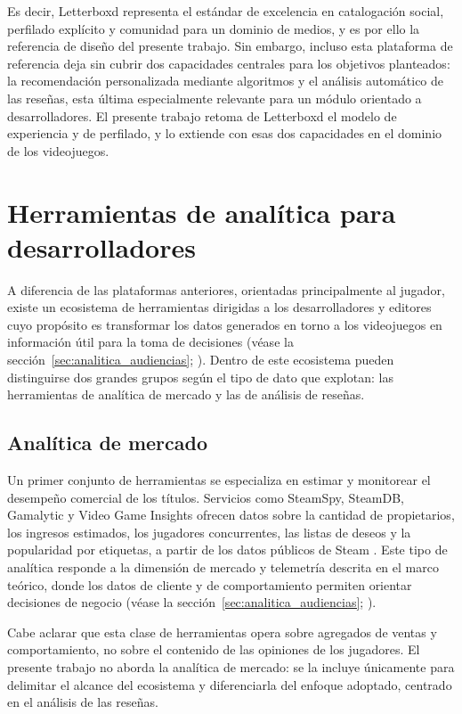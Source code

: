 Es decir, Letterboxd representa el estándar de excelencia en catalogación social, perfilado explícito y comunidad para un dominio de medios, y es por ello la referencia de diseño del presente trabajo. Sin embargo, incluso esta plataforma de referencia deja sin cubrir dos capacidades centrales para los objetivos planteados: la recomendación personalizada mediante algoritmos y el análisis automático de las reseñas, esta última especialmente relevante para un módulo orientado a desarrolladores. El presente trabajo retoma de Letterboxd el modelo de experiencia y de perfilado, y lo extiende con esas dos capacidades en el dominio de los videojuegos.

\section{Herramientas de analítica para desarrolladores}\label{sec:herramientas_analitica}

A diferencia de las plataformas anteriores, orientadas principalmente al jugador, existe un ecosistema de herramientas dirigidas a los desarrolladores y editores cuyo propósito es transformar los datos generados en torno a los videojuegos en información útil para la toma de decisiones (véase la sección~\ref{sec:analitica_audiencias}; \parencite{DrachenEtAl2011}). Dentro de este ecosistema pueden distinguirse dos grandes grupos según el tipo de dato que explotan: las herramientas de analítica de mercado y las de análisis de reseñas.

\subsection{Analítica de mercado}\label{subsec:analitica_mercado}

Un primer conjunto de herramientas se especializa en estimar y monitorear el desempeño comercial de los títulos. Servicios como SteamSpy, SteamDB, Gamalytic y Video Game Insights ofrecen datos sobre la cantidad de propietarios, los ingresos estimados, los jugadores concurrentes, las listas de deseos y la popularidad por etiquetas, a partir de los datos públicos de Steam \parencite{SteamSpy, VideoGameInsights}. Este tipo de analítica responde a la dimensión de mercado y telemetría descrita en el marco teórico, donde los datos de cliente y de comportamiento permiten orientar decisiones de negocio (véase la sección~\ref{sec:analitica_audiencias}; \parencite{DrachenEtAl2011}).

Cabe aclarar que esta clase de herramientas opera sobre agregados de ventas y comportamiento, no sobre el contenido de las opiniones de los jugadores. El presente trabajo no aborda la analítica de mercado: se la incluye únicamente para delimitar el alcance del ecosistema y diferenciarla del enfoque adoptado, centrado en el análisis de las reseñas.

